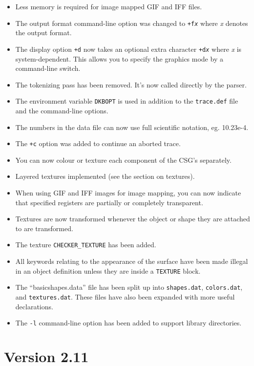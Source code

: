 \begin{itemize}
\item Less memory is required for image mapped GIF and IFF files.
\item The output format command-line option was changed to
{\tt +f{\em x}} where {\em x} denotes the output format.
\item The display option {\tt +d} now takes an optional extra
character {\tt +d{\em x}} where {\em x} is system-dependent.  This
allows you to specify the graphics mode by a command-line switch.
\item The tokenizing pass has been removed.  It's now called directly by the
parser.
\item The environment variable
{\tt DKBOPT} is used
in addition to the
{\tt trace.def} file
and the command-line options.
\item The numbers in the data file can now use full scientific
notation, eg. 10.23e-4.
\item The {\tt +c} option was added to continue an aborted trace.
\item You can now colour or texture each component of the CSG's separately.
\item Layered textures implemented (see the
section on textures).
\item When using GIF and IFF images for image mapping, you can now
indicate that specified registers are partially or completely transparent.
\item Textures are now transformed whenever the object or shape they
are attached to are transformed.
\item The texture {\tt CHECKER_TEXTURE} has
been added.
\item All keywords relating to the appearance of the surface have been made
illegal in an object definition unless they are inside a {\tt TEXTURE} block.
\item The ``basicshapes.data'' file has been split up into {\tt shapes.dat},
{\tt colors.dat}, and {\tt textures.dat}.  These files have also been expanded
with more useful declarations.
\item The {\tt -l} command-line option has been
added to support library directories.
\end{itemize}

\section*{Version 2.11}

